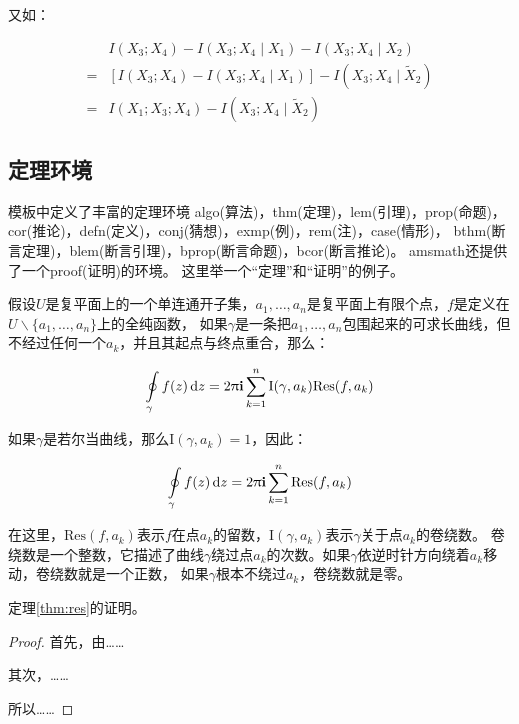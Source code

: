 又如：

\begin{align}
  \label{eq:none}
  & I(X_3;X_4)-I(X_3;X_4\mid{}X_1)-I(X_3;X_4\mid{}X_2) \nonumber \\
  = & [I(X_3;X_4)-I(X_3;X_4\mid{}X_1)]-I(X_3;X_4\mid{}\tilde{X}_2) \\
  = & I(X_1;X_3;X_4)-I(X_3;X_4\mid{}\tilde{X}_2)
\end{align}

\subsection{定理环境}

模板中定义了丰富的定理环境
algo(算法)，thm(定理)，lem(引理)，prop(命题)，cor(推论)，defn(定义)，conj(猜想)，exmp(例)，rem(注)，case(情形)，
bthm(断言定理)，blem(断言引理)，bprop(断言命题)，bcor(断言推论)。
amsmath还提供了一个proof(证明)的环境。
这里举一个“定理”和“证明”的例子。
\begin{thm}[留数定理]
\label{thm:res}
  假设$U$是复平面上的一个单连通开子集，$a_1,\ldots,a_n$是复平面上有限个点，$f$是定义在$U\backslash \{a_1,\ldots,a_n\}$上的全纯函数，
  如果$\gamma$是一条把$a_1,\ldots,a_n$包围起来的可求长曲线，但不经过任何一个$a_k$，并且其起点与终点重合，那么：

  \begin{equation}
    \label{eq:res}
    \ointop_{\gamma}f(z)\,\mathrm{d}z = 2\uppi\mathbf{i}\sum^n_{k=1}\mathrm{I}(\gamma,a_k)\mathrm{Res}(f,a_k)
  \end{equation}

  如果$\gamma$是若尔当曲线，那么$\mathrm{I}(\gamma, a_k)=1$，因此：

  \begin{equation}
    \label{eq:resthm}
    \ointop_{\gamma}f(z)\,\mathrm{d}z = 2\uppi\mathbf{i}\sum^n_{k=1}\mathrm{Res}(f,a_k)
  \end{equation}


  在这里，$\mathrm{Res}(f, a_k)$表示$f$在点$a_k$的留数，$\mathrm{I}(\gamma,a_k)$表示$\gamma$关于点$a_k$的卷绕数。
  卷绕数是一个整数，它描述了曲线$\gamma$绕过点$a_k$的次数。如果$\gamma$依逆时针方向绕着$a_k$移动，卷绕数就是一个正数，
  如果$\gamma$根本不绕过$a_k$，卷绕数就是零。

  定理\ref{thm:res}的证明。
  
  \begin{proof}
    首先，由……

    其次，……

    所以……
  \end{proof}
\end{thm}

